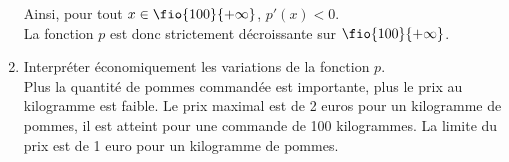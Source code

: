 \documentclass[a4paper,11pt,exos]{nsi} %
\begin{document}
\begin{enumerate}
    Ainsi, pour tout $x\in\fio{100}{+\infty}$, $p'(x)<0$.\\
    La fonction $p$ est donc strictement décroissante sur $\fio{100}{+\infty}$.
    \begin{center}
    \end{center}
    \item \textcolor{UGLiBlue}{Interpréter économiquement les variations de la fonction $p$.}\\[.5em]
    Plus la quantité de pommes commandée est importante, plus le prix au kilogramme est faible. Le prix maximal est de 2 euros pour un kilogramme de pommes, il est atteint pour une commande de 100 kilogrammes. La limite du prix est de 1 euro pour un kilogramme de pommes.
\end{enumerate}
\end{document}
